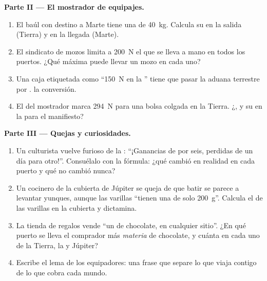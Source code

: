 \begin{problem}
\medskip\noindent\textbf{Parte II --- El mostrador de equipajes.}
\begin{enumerate}[resume]
  \item El baúl con destino a Marte tiene una  de \qty{40}{kg}.
        Calcula su  en la salida (Tierra) y en la llegada
        (Marte).
  \item El sindicato de mozos limita a \qty{200}{N} el
        \emph{} que se lleva a mano en todos los puertos.
        ¿Qué \emph{} máxima puede llevar un mozo en cada
        uno?
  \item Una caja etiquetada como ``\qty{150}{N} en la
        '' tiene que pasar la aduana terrestre por
        .  la conversión.
  \item El  del mostrador marca \qty{294}{N} para
        una bolsa colgada en la Tierra. ¿, y su
         en la  para el manifiesto?
\end{enumerate}

\medskip\noindent\textbf{Parte III --- Quejas y curiosidades.}
\begin{enumerate}[resume]
  \item Un culturista vuelve furioso de la : ``¡Ganancias
        de  por seis, perdidas de un día para otro!''.
        Consuélalo con la fórmula: ¿qué cambió en realidad en cada
        puerto y qué no cambió nunca?
  \item Un cocinero de la cubierta de Júpiter se queja de que batir
        se parece a levantar yunques, aunque las varillas ``tienen
        una  de solo \qty{200}{g}''. Calcula el
         de las varillas en la cubierta y dictamina.
  \item La tienda de regalos vende ``un  de chocolate,
        en cualquier sitio''. ¿En qué puerto se lleva el comprador
        más \emph{materia} de chocolate, y cuánta  en
        cada uno de la Tierra, la  y Júpiter?
  \item Escribe el lema de los equipadores: una frase que separe lo
        que viaja contigo de lo que cobra cada mundo.
\end{enumerate}
\end{problem}
